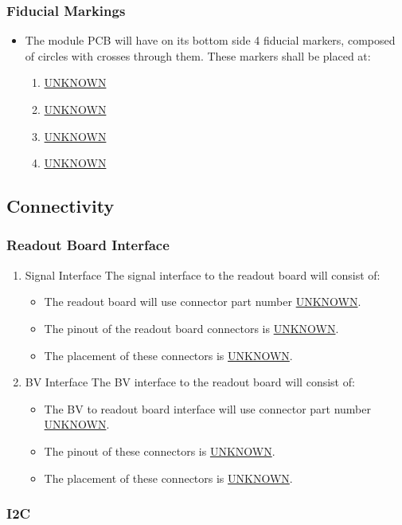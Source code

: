 \documentclass[11pt]{article}
\begin{document}
\subsubsection{Fiducial Markings}
\label{sec:orga2a40f7}
\begin{itemize}
\item The module PCB will have on its bottom side 4 fiducial markers, composed of circles with crosses through them. These markers shall be placed at:
\begin{enumerate}
\item \uline{UNKNOWN}
\item \uline{UNKNOWN}
\item \uline{UNKNOWN}
\item \uline{UNKNOWN}
\end{enumerate}
\end{itemize}
\subsection{Connectivity}
\label{sec:org85f2608}
\subsubsection{Readout Board Interface}
\label{sec:org15b99a9}
\begin{enumerate}
\item Signal Interface
\label{sec:orgd3a35d3}
The signal interface to the readout board will consist of:
\begin{itemize}
\item The readout board will use connector part number \uline{UNKNOWN}.
\item The pinout of the readout board connectors is \uline{UNKNOWN}.
\item The placement of these connectors is \uline{UNKNOWN}.
\end{itemize}
\item BV Interface
\label{sec:org9685554}
The BV interface to the readout board will consist of:
\begin{itemize}
\item The BV to readout board interface will use connector part number \uline{UNKNOWN}.
\item The pinout of these connectors is \uline{UNKNOWN}.
\item The placement of these connectors is \uline{UNKNOWN}.
\end{itemize}
\end{enumerate}
\subsubsection{I2C}
\label{sec:org7ab7be2}
\end{document}
